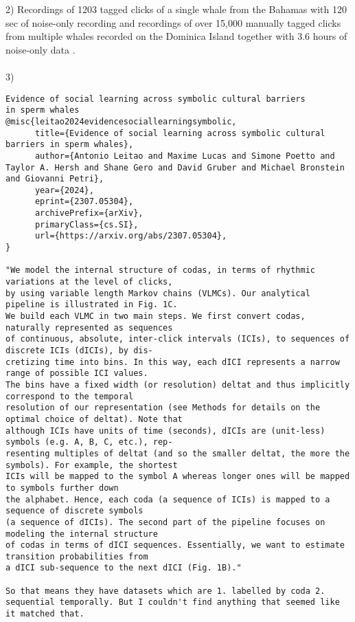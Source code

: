 \documentclass{article}
\begin{document}
2) Recordings of 1203 tagged clicks of a single whale from the Bahamas with 120 sec of noise-only recording and recordings of over 15,000 manually tagged clicks from multiple whales recorded on the Dominica Island together with 3.6 hours of noise-only data \cite{ceti}. \\ \\
3)
\begin{lstlisting}[breaklines=true, breakatwhitespace=true, columns=flexible, basicstyle=\ttfamily\small]
Evidence of social learning across symbolic cultural barriers
in sperm whales
@misc{leitao2024evidencesociallearningsymbolic,
      title={Evidence of social learning across symbolic cultural barriers in sperm whales}, 
      author={Antonio Leitao and Maxime Lucas and Simone Poetto and Taylor A. Hersh and Shane Gero and David Gruber and Michael Bronstein and Giovanni Petri},
      year={2024},
      eprint={2307.05304},
      archivePrefix={arXiv},
      primaryClass={cs.SI},
      url={https://arxiv.org/abs/2307.05304}, 
}

"We model the internal structure of codas, in terms of rhythmic variations at the level of clicks,
by using variable length Markov chains (VLMCs). Our analytical pipeline is illustrated in Fig. 1C.
We build each VLMC in two main steps. We first convert codas, naturally represented as sequences
of continuous, absolute, inter-click intervals (ICIs), to sequences of discrete ICIs (dICIs), by dis-
cretizing time into bins. In this way, each dICI represents a narrow range of possible ICI values.
The bins have a fixed width (or resolution) deltat and thus implicitly correspond to the temporal
resolution of our representation (see Methods for details on the optimal choice of deltat). Note that
although ICIs have units of time (seconds), dICIs are (unit-less) symbols (e.g. A, B, C, etc.), rep-
resenting multiples of deltat (and so the smaller deltat, the more the symbols). For example, the shortest
ICIs will be mapped to the symbol A whereas longer ones will be mapped to symbols further down
the alphabet. Hence, each coda (a sequence of ICIs) is mapped to a sequence of discrete symbols
(a sequence of dICIs). The second part of the pipeline focuses on modeling the internal structure
of codas in terms of dICI sequences. Essentially, we want to estimate transition probabilities from
a dICI sub-sequence to the next dICI (Fig. 1B)."

So that means they have datasets which are 1. labelled by coda 2. sequential temporally. But I couldn't find anything that seemed like it matched that.



\end{lstlisting}
\end{document}
